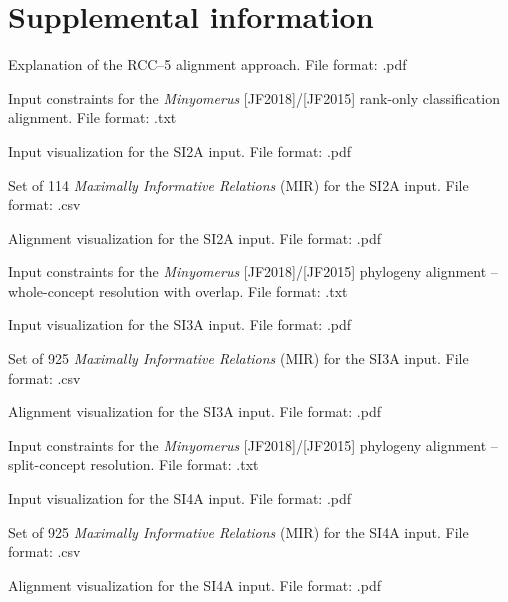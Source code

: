 \documentclass[fleqn,10pt,lineno]{wlpeerj} %
\begin{document}
\section*{Supplemental information}
		\begin{description}[itemsep=-1ex]
			\item[\texttt{SI1}] Explanation of the RCC--5 alignment approach. File format: .pdf
			\item[\texttt{SI2A}] Input constraints for the \textit{Minyomerus} [JF2018]/[JF2015] rank-only classification alignment. File format: .txt
			\item[\texttt{SI2B}] Input visualization for the SI2A input. File format: .pdf
			\item[\texttt{SI2C}] Set of 114 \textit{Maximally Informative Relations} (MIR) for the SI2A input. File format: .csv
			\item[\texttt{SI2D}] Alignment visualization for the SI2A input. File format: .pdf
			\item[\texttt{SI3A}] Input constraints for the \textit{Minyomerus} [JF2018]/[JF2015] phylogeny alignment -- whole-concept resolution with overlap. File format: .txt
			\item[\texttt{SI3B}] Input visualization for the SI3A input. File format: .pdf
			\item[\texttt{SI3C}] Set of 925 \textit{Maximally Informative Relations} (MIR) for the SI3A input. File format: .csv
			\item[\texttt{SI3D}] Alignment visualization for the SI3A input. File format: .pdf
			\item[\texttt{SI4A}] Input constraints for the \textit{Minyomerus} [JF2018]/[JF2015] phylogeny alignment -- split-concept resolution. File format: .txt
			\item[\texttt{SI4B}] Input visualization for the SI4A input. File format: .pdf
			\item[\texttt{SI4C}] Set of 925 \textit{Maximally Informative Relations} (MIR) for the SI4A input. File format: .csv
			\item[\texttt{SI4D}] Alignment visualization for the SI4A input. File format: .pdf
		\end{description}

\newpage


\nocite{*}
\end{document}
